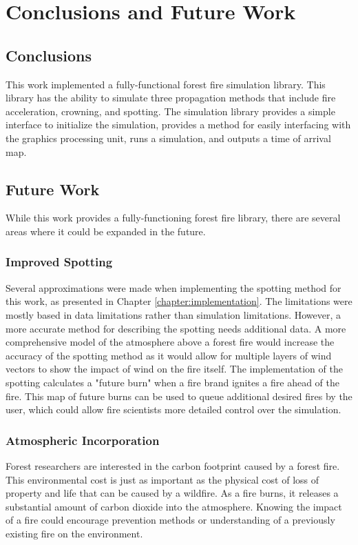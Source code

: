 \chapter{Conclusions and Future Work}
\label{chapter:conclusions}

\section{Conclusions}
This work implemented a fully-functional forest fire simulation library. This library has the ability to simulate three propagation methods that include fire acceleration, crowning, and spotting. The simulation library provides a simple interface to initialize the simulation, provides a method for easily interfacing with the graphics processing unit, runs a simulation, and outputs a time of arrival map. 

\section{Future Work}
While this work provides a fully-functioning forest fire library, there are several areas where it could be expanded in the future. 

\subsection{Improved Spotting} 
Several approximations were made when implementing the spotting method for this work, as presented in Chapter \ref{chapter:implementation}. The limitations were mostly based in data limitations rather than simulation limitations. However, a more accurate method for describing the spotting needs additional data. A more comprehensive model of the atmosphere above a forest fire would increase the accuracy of the spotting method as it would allow for multiple layers of wind vectors to show the impact of wind on the fire itself. The implementation of the spotting calculates a "future burn" when a fire brand ignites a fire ahead of the fire. This map of future burns can be used to queue additional desired fires by the user, which could allow fire scientists more detailed control over the simulation. 

\subsection{Atmospheric Incorporation}
Forest researchers are interested in the carbon footprint caused by a forest fire. This environmental cost is just as important as the physical cost of loss of property and life that can be caused by a wildfire. As a fire burns, it releases a substantial amount of carbon dioxide into the atmosphere. Knowing the impact of a fire could encourage prevention methods or understanding of a previously existing fire on the environment. 

